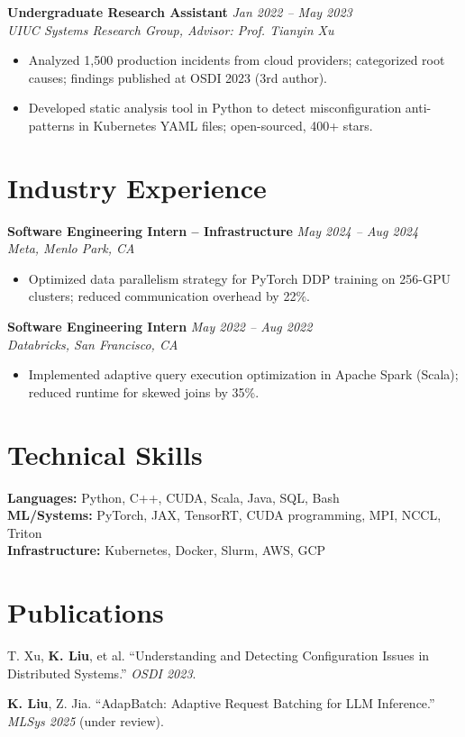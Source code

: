 \documentclass[11pt,a4paper]{article}
\begin{document}
\vspace{4pt}
\noindent\textbf{Undergraduate Research Assistant} \hfill \textit{Jan 2022 -- May 2023}\\
\textit{UIUC Systems Research Group, Advisor: Prof. Tianyin Xu}
\begin{itemize}
  \item Analyzed 1,500 production incidents from cloud providers; categorized root causes; findings published at OSDI 2023 (3rd author).
  \item Developed static analysis tool in Python to detect misconfiguration anti-patterns in Kubernetes YAML files; open-sourced, 400+ stars.
\end{itemize}

\section{Industry Experience}

\noindent\textbf{Software Engineering Intern -- Infrastructure} \hfill \textit{May 2024 -- Aug 2024}\\
\textit{Meta, Menlo Park, CA}
\begin{itemize}
  \item Optimized data parallelism strategy for PyTorch DDP training on 256-GPU clusters; reduced communication overhead by 22\%.
\end{itemize}

\vspace{4pt}
\noindent\textbf{Software Engineering Intern} \hfill \textit{May 2022 -- Aug 2022}\\
\textit{Databricks, San Francisco, CA}
\begin{itemize}
  \item Implemented adaptive query execution optimization in Apache Spark (Scala); reduced runtime for skewed joins by 35\%.
\end{itemize}

\section{Technical Skills}
\textbf{Languages:} Python, C++, CUDA, Scala, Java, SQL, Bash\\
\textbf{ML/Systems:} PyTorch, JAX, TensorRT, CUDA programming, MPI, NCCL, Triton\\
\textbf{Infrastructure:} Kubernetes, Docker, Slurm, AWS, GCP

\section{Publications}
\begin{enumerate}[leftmargin=*, label={[\arabic*]}]
  \item T. Xu, \textbf{K. Liu}, et al. ``Understanding and Detecting Configuration Issues in Distributed Systems.'' \textit{OSDI 2023}.
  \item \textbf{K. Liu}, Z. Jia. ``AdapBatch: Adaptive Request Batching for LLM Inference.'' \textit{MLSys 2025} (under review).
\end{enumerate}
\end{document}
